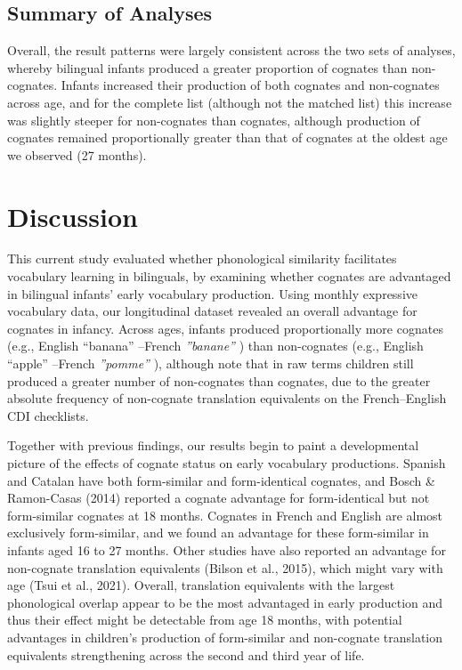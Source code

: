 \documentclass[
  english,
  ,man,floatsintext]{apa6}
\begin{document}
\hypertarget{summary-of-analyses}{%
\subsection{Summary of Analyses}\label{summary-of-analyses}}

Overall, the result patterns were largely consistent across the two sets of analyses, whereby bilingual infants produced a greater proportion of cognates than non-cognates. Infants increased their production of both cognates and non-cognates across age, and for the complete list (although not the matched list) this increase was slightly steeper for non-cognates than cognates, although production of cognates remained proportionally greater than that of cognates at the oldest age we observed (27 months).

\hypertarget{discussion}{%
\section{Discussion}\label{discussion}}

This current study evaluated whether phonological similarity facilitates vocabulary learning in bilinguals, by examining whether cognates are advantaged in bilingual infants' early vocabulary production. Using monthly expressive vocabulary data, our longitudinal dataset revealed an overall advantage for cognates in infancy. Across ages, infants produced proportionally more cognates (e.g., English ``banana'' --French \emph{''banane''} ) than non-cognates (e.g., English ``apple'' --French \emph{''pomme''} ), although note that in raw terms children still produced a greater number of non-cognates than cognates, due to the greater absolute frequency of non-cognate translation equivalents on the French--English CDI checklists.

Together with previous findings, our results begin to paint a developmental picture of the effects of cognate status on early vocabulary productions. Spanish and Catalan have both form-similar and form-identical cognates, and Bosch \& Ramon-Casas (2014) reported a cognate advantage for form-identical but not form-similar cognates at 18 months. Cognates in French and English are almost exclusively form-similar, and we found an advantage for these form-similar in infants aged 16 to 27 months. Other studies have also reported an advantage for non-cognate translation equivalents (Bilson et al., 2015), which might vary with age (Tsui et al., 2021). Overall, translation equivalents with the largest phonological overlap appear to be the most advantaged in early production and thus their effect might be detectable from age 18 months, with potential advantages in children's production of form-similar and non-cognate translation equivalents strengthening across the second and third year of life.
\end{document}
